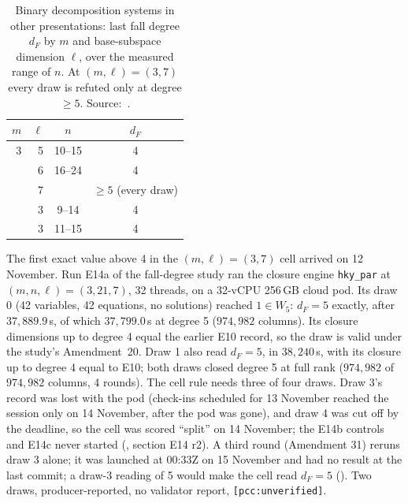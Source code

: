 \begin{table}[t]
\centering\small
\begin{tabular}{@{}rrcc@{}}
\toprule
$m$ & $\ell$ & $n$ & $d_F$ \\
\midrule
3 & 5 & 10--15 & 4 \\
  & 6 & 16--24 & 4 \\
  & 7 &        & $\ge5$ (every draw) \\
\addlinespace
4 & 3 & 9--14  & 4 \\
\addlinespace
5 & 3 & 11--15 & 4 \\
\bottomrule
\end{tabular}
\caption[]{Binary decomposition systems in other presentations: last fall
degree $d_F$ by $m$ and base-subspace dimension $\ell$, over the measured
range of $n$. At $(m,\ell)=(3,7)$ every draw is refuted only at degree
$\ge5$. Source:~\cite[\S6]{icprogram2026}.}
\label{tab:fd-other}
\end{table}

The first exact value above 4 in the $(m,\ell)=(3,7)$ cell arrived on
12 November. Run E14a of the fall-degree study ran the closure engine
\texttt{hky\_par} at $(m,n,\ell)=(3,21,7)$, 32 threads, on a 32-vCPU
256\,GB cloud pod. Its draw 0 (42 variables, 42 equations, no solutions)
reached $1\in W_5$: $d_F=5$ exactly, after $37{,}889.9$\,s, of which
$37{,}799.0$\,s at degree 5 ($974{,}982$ columns). Its closure dimensions up
to degree 4 equal the earlier E10 record, so the draw is valid under the
study's Amendment~20. Draw 1 also read $d_F=5$, in $38{,}240$\,s, with its
closure up to degree 4 equal to E10; both draws closed degree 5 at full
rank ($974{,}982$ of $974{,}982$ columns, 4 rounds). The cell rule needs three of
four draws. Draw 3's record was lost with the pod (check-ins scheduled for
13 November reached the session only on 14 November, after the pod was
gone), and draw 4 was cut off by the deadline, so the cell was scored
``split'' on 14 November; the E14b controls and E14c never started
(, section E14 r2). A third round
(Amendment 31) reruns draw 3 alone; it was launched at 00:33Z on
15 November and had no result at the last commit; a draw-3 reading of 5
would make the cell read $d_F=5$
(). Two draws,
producer-reported, no validator report, \texttt{[pcc:unverified]}.

